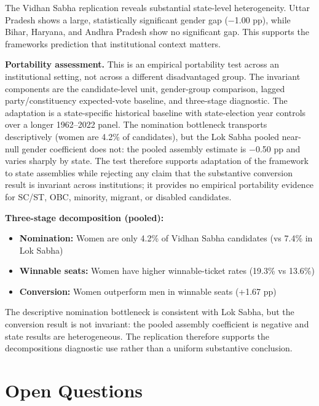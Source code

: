 \documentclass[
]{article}
\providecommand{\tightlist}{%
  \setlength{\itemsep}{0pt}\setlength{\parskip}{0pt}}
\begin{document}
The Vidhan Sabha replication reveals substantial state-level heterogeneity. Uttar Pradesh shows a large, statistically significant gender gap ($-$1.00 pp), while Bihar, Haryana, and Andhra Pradesh show no significant gap. This supports the framework\textquotesingle s prediction that institutional context matters.

\textbf{Portability assessment.} This is an empirical portability test across an institutional setting, not across a different disadvantaged group. The invariant components are the candidate-level unit, gender-group comparison, lagged party/constituency expected-vote baseline, and three-stage diagnostic. The adaptation is a state-specific historical baseline with state-election year controls over a longer 1962--2022 panel. The nomination bottleneck transports descriptively (women are 4.2\% of candidates), but the Lok Sabha pooled near-null gender coefficient does not: the pooled assembly estimate is $-$0.50 pp and varies sharply by state. The test therefore supports adaptation of the framework to state assemblies while rejecting any claim that the substantive conversion result is invariant across institutions; it provides no empirical portability evidence for SC/ST, OBC, minority, migrant, or disabled candidates.

\textbf{Three-stage decomposition (pooled):}

\begin{itemize}
\tightlist
\item
  \textbf{Nomination:} Women are only 4.2\% of Vidhan Sabha candidates (vs 7.4\% in Lok Sabha)
\item
  \textbf{Winnable seats:} Women have higher winnable-ticket rates (19.3\% vs 13.6\%)
\item
  \textbf{Conversion:} Women outperform men in winnable seats (+1.67 pp)
\end{itemize}

The descriptive nomination bottleneck is consistent with Lok Sabha, but the conversion result is not invariant: the pooled assembly coefficient is negative and state results are heterogeneous. The replication therefore supports the decomposition\textquotesingle s diagnostic use rather than a uniform substantive conclusion.

\section{Open Questions}\label{open-questions}
\end{document}
